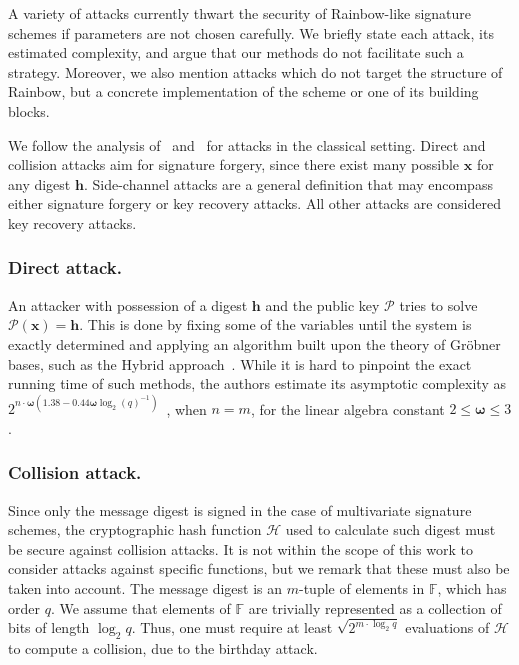 \documentclass[english]{ufsc-thesis-rn46-2019/ufsc-thesis-rn46-2019}
\theoremstyle{definition}
\begin{document}
A variety of attacks currently thwart the security of Rainbow-like signature
schemes if parameters are not chosen carefully. We briefly state each attack,
its estimated complexity, and argue that our methods do not facilitate such
a strategy. Moreover, we also mention attacks which do not target the structure
of Rainbow, but a concrete implementation of the scheme or one of its building
blocks.

We follow the analysis of~\cite[Sec.~8]{Ding:201901} and~\cite{Petzoldt:201005}
for attacks in the classical setting. Direct and collision attacks aim for
signature forgery, since there exist many possible $\mathbf{x}$ for any digest
$\mathbf{h}$. Side-channel attacks are a general definition that may encompass
either signature forgery or key recovery attacks. All other attacks are
considered key recovery attacks.

\subsubsection{Direct attack.}

An attacker with possession of a digest $\mathbf{h}$ and the public key
$\mathcal{P}$ tries to solve $\mathcal{P}(\mathbf{x}) = \mathbf{h}$. This is
done by fixing some of the variables until the system is exactly determined and
applying an algorithm built upon the theory of Gröbner bases, such as the
Hybrid approach~\cite{Bettale:201207}. While it is hard to pinpoint the exact
running time of such methods, the authors estimate its asymptotic complexity as
$2^{n \cdot \bm{\omega} (1.38 - 0.44 \bm{\omega}
  \log_{2} {(q)}^{-1})}$~\cite[Thm.~3]{Bettale:201207}, when $n = m$, for the
linear algebra constant $2 \leq \bm{\omega} \leq 3$.

\subsubsection{Collision attack.}

Since only the message digest is signed in the case of multivariate signature
schemes, the cryptographic hash function $\mathcal{H}$ used to calculate such
digest must be secure against collision attacks. It is not within the scope of
this work to consider attacks against specific functions, but we remark that
these must also be taken into account. The message digest is an $m$-tuple of
elements in $\mathbb{F}$, which has order $q$. We assume that elements of
$\mathbb{F}$ are trivially represented as a collection of bits of length
$\log_{2} q$. Thus, one must require at least $\sqrt{2^{m \cdot \log_{2} q}}$
evaluations of $\mathcal{H}$ to compute a collision, due to the birthday
attack.
\end{document}
